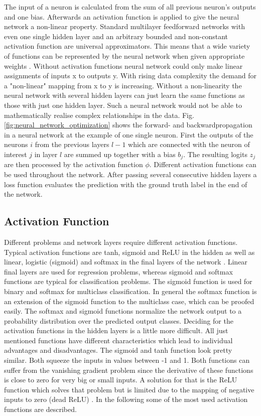 The input of a neuron is calculated from the sum of all previous neuron's outputs and one bias. Afterwards an activation function is applied to give the neural network a non-linear property. Standard multilayer feedforward networks with even one single hidden layer and an arbitrary bounded and non-constant activation function are universal approximators. This means that a wide variety of functions can be represented by the neural network when given appropriate weights \cite{HORNIK1991}. Without activation functions neural network could only make linear assignments of inputs x to outputs y. With rising data complexity the demand for a "non-linear" mapping from x to y is increasing. Without a non-linearity the neural network with several hidden layers can just learn the same functions as those with just one hidden layer. Such a neural network would not be able to mathematically realise complex relationships in the data. Fig. \ref{fig:neural_network_optimization} shows the forward- and backwardpropagation in a neural network at the example of one single neuron. First the outputs of the neurons $i$ from the previous layers $l-1$ which are connected with the neuron of interest $j$ in layer $l$ are summed up together with a bias $b_{j}$. The resulting logits $z_{j}$ are then processed by the activation function $\phi$. Different activation functions can be used throughout the network. After passing several consecutive hidden layers a loss function evaluates the prediction with the ground truth label in the end of the network.

\subsection{Activation Function}
Different problems and network layers require different activation functions. Typical activation functions are tanh, sigmoid and ReLU in the hidden as well as linear, logistic (sigmoid) and softmax in the final layers of the network \cite{Brownlee2021}. Linear final layers are used for regression problems, whereas sigmoid and softmax functions are typical for classification problems. The sigmoid function is used for binary and softmax for multiclass classification. In general the softmax function is an extension of the sigmoid function to the multiclass case, which can be proofed easily. The softmax and sigmoid functions normalize the network output to a probability distribution over the predicted output classes.  Deciding for the activation functions in the hidden layers is a little more difficult. All just mentioned functions have different characteristics which lead to individual advantages and disadvantages. The sigmoid and tanh function look pretty similar. Both squeeze the inputs in values between -1 and 1. Both functions can suffer from the vanishing gradient problem since the derivative of these functions is close to zero for very big or small inputs. A solution for that is the ReLU function which solves that problem but is limited due to the mapping of negative inputs to zero (dead ReLU) \cite{Brownlee2021}. In the following some of the most used activation functions are described.

